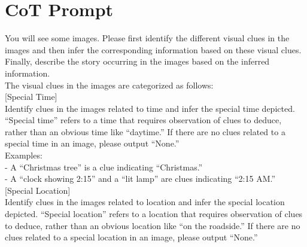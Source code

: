 \section{CoT Prompt}
\label{section:cot_prompt} 

\begin{figure*}[hbt!]
    \begin{center}
        \begin{tcolorbox}[colback=gray!10,%
                          colframe=black,%
                          width=17cm,%
                          arc=1mm, auto outer arc,
                          boxrule=0.5pt,
                          fontupper=\tiny
                         ]
            You will see some images. Please first identify the different visual clues in the images and then infer the corresponding information based on these visual clues. Finally, describe the story occurring in the images based on the inferred information. \\
    
            The visual clues in the images are categorized as follows: \\
            
            [Special Time] \\
            Identify clues in the images related to time and infer the special time depicted. ``Special time'' refers to a time that requires observation of clues to deduce, rather than an obvious time like ``daytime.'' If there are no clues related to a special time in an image, please output ``None.''  \\
            
            Examples:  \\
            - A ``Christmas tree'' is a clue indicating ``Christmas.''  \\
            - A ``clock showing 2:15'' and a ``lit lamp'' are clues indicating ``2:15 AM.''  \\
            
            [Special Location]  \\
            Identify clues in the images related to location and infer the special location depicted. ``Special location'' refers to a location that requires observation of clues to deduce, rather than an obvious location like ``on the roadside.'' If there are no clues related to a special location in an image, please output ``None.''  \\
            

\end{tcolorbox}
\end{center}
\end{figure*}
